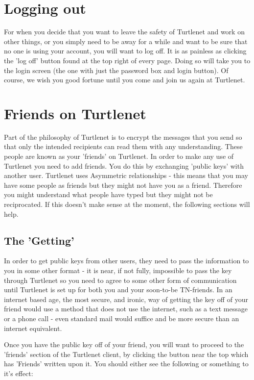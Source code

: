 \section{Logging out}
For when you decide that you want to leave the safety of Turtlenet and work on
other things, or you simply need to be away for a while and want to be sure that
no one is using your account, you will want to log off.  It is as painless as
clicking the 'log off' button found at the top right of every page.  Doing so
will take you to the login screen (the one with just the password box and login
button).  Of course, we wish you good fortune until you come and join us again
at Turtlenet.

\section{Friends on Turtlenet}
Part of the philosophy of Turtlenet is to encrypt the messages that you send so
that only the intended recipients can read them with any understanding.  These
people are known as your 'friends' on Turtlenet.  In order to make any use of
Turtlenet you need to add friends.  You do this by exchanging 'public keys' with
another user.  Turtlenet uses Asymmetric relationships - this means that you may
have some people as friends but they might not have you as a friend.  Therefore
you might understand what people have typed but they might not be reciprocated.
If this doesn't make sense at the moment, the following sections will help.

\subsection{The 'Getting'}
In order to get public keys from other users, they need to pass the information
to you in some other format - it is near, if not fully, impossible to pass the
key through Turtlenet so you need to agree to some other form of communication
until Turtlenet is set up for both you and your soon-to-be TN-friends.  In an
internet based age, the most secure, and ironic, way of getting the key off of
your friend would use a method that does not use the internet, such as a text
message or a phone call - even standard mail would suffice and be more secure
than an internet equivalent.

Once you have the public key off of your friend, you will want to proceed to the
'friends' section of the Turtlenet client, by clicking the button near the top
which has 'Friends' written upon it.  You should either see the following or
something to it's effect:

